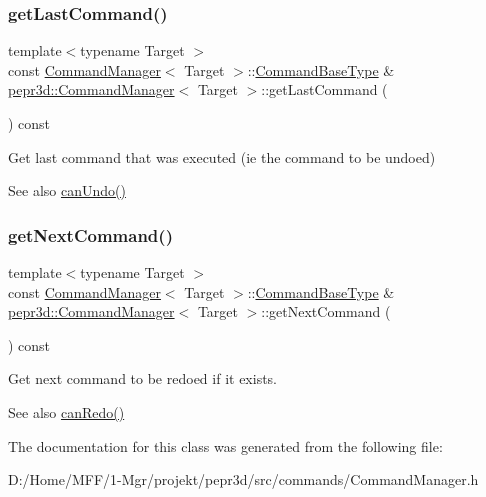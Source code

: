 \subsubsection{\texorpdfstring{getLastCommand()}{getLastCommand()}}
{\footnotesize\ttfamily template$<$typename Target $>$ \\
const \mbox{\hyperlink{classpepr3d_1_1_command_manager}{Command\+Manager}}$<$ Target $>$\+::\mbox{\hyperlink{classpepr3d_1_1_command_base}{Command\+Base\+Type}} \& \mbox{\hyperlink{classpepr3d_1_1_command_manager}{pepr3d\+::\+Command\+Manager}}$<$ Target $>$\+::get\+Last\+Command (\begin{DoxyParamCaption}{ }\end{DoxyParamCaption}) const}



Get last command that was executed (ie the command to be undoed) 

\begin{DoxySeeAlso}{See also}
\mbox{\hyperlink{classpepr3d_1_1_command_manager_a2d53a763697329e206e72ddeef1ce75b}{can\+Undo()}} 
\end{DoxySeeAlso}
\mbox{\label{classpepr3d_1_1_command_manager_ab5767a90a4f309d166210a8e43dec560}} 
\subsubsection{\texorpdfstring{getNextCommand()}{getNextCommand()}}
{\footnotesize\ttfamily template$<$typename Target $>$ \\
const \mbox{\hyperlink{classpepr3d_1_1_command_manager}{Command\+Manager}}$<$ Target $>$\+::\mbox{\hyperlink{classpepr3d_1_1_command_base}{Command\+Base\+Type}} \& \mbox{\hyperlink{classpepr3d_1_1_command_manager}{pepr3d\+::\+Command\+Manager}}$<$ Target $>$\+::get\+Next\+Command (\begin{DoxyParamCaption}{ }\end{DoxyParamCaption}) const}



Get next command to be redoed if it exists. 

\begin{DoxySeeAlso}{See also}
\mbox{\hyperlink{classpepr3d_1_1_command_manager_a2ae3625cc0baac8bb27f659ee0182eff}{can\+Redo()}} 
\end{DoxySeeAlso}


The documentation for this class was generated from the following file\+:\begin{DoxyCompactItemize}
\item 
D\+:/\+Home/\+M\+F\+F/1-\/\+Mgr/projekt/pepr3d/src/commands/Command\+Manager.\+h\end{DoxyCompactItemize}
